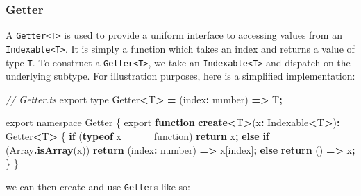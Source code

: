 \documentclass[
  openany]{book}
\newenvironment{Shaded}{\begin{snugshade}}{\end{snugshade}}
\newcommand{\BuiltInTok}[1]{#1}
\newcommand{\CommentTok}[1]{\textcolor[rgb]{0.56,0.35,0.01}{\textit{#1}}}
\newcommand{\ControlFlowTok}[1]{\textcolor[rgb]{0.13,0.29,0.53}{\textbf{#1}}}
\newcommand{\DataTypeTok}[1]{\textcolor[rgb]{0.13,0.29,0.53}{#1}}
\newcommand{\FunctionTok}[1]{\textcolor[rgb]{0.13,0.29,0.53}{\textbf{#1}}}
\newcommand{\ImportTok}[1]{#1}
\newcommand{\KeywordTok}[1]{\textcolor[rgb]{0.13,0.29,0.53}{\textbf{#1}}}
\newcommand{\NormalTok}[1]{#1}
\newcommand{\OperatorTok}[1]{\textcolor[rgb]{0.81,0.36,0.00}{\textbf{#1}}}
\newcommand{\VerbatimStringTok}[1]{\textcolor[rgb]{0.31,0.60,0.02}{#1}}
\theoremstyle{definition}
\theoremstyle{definition}
\theoremstyle{definition}
\theoremstyle{definition}
\theoremstyle{remark}
\begin{document}
\subsubsection{Getter}\label{getter}

A \texttt{Getter\textless{}T\textgreater{}} is used to provide a uniform interface to accessing values from an \texttt{Indexable\textless{}T\textgreater{}}. It is simply a function which takes an index and returns a value of type \texttt{T}. To construct a \texttt{Getter\textless{}T\textgreater{}}, we take an \texttt{Indexable\textless{}T\textgreater{}} and dispatch on the underlying subtype. For illustration purposes, here is a simplified implementation:

\begin{Shaded}
\begin{Highlighting}[]
\CommentTok{// Getter.ts}
\ImportTok{export type}\NormalTok{ Getter}\OperatorTok{\textless{}}\NormalTok{T}\OperatorTok{\textgreater{}} \OperatorTok{=}\NormalTok{ (index}\OperatorTok{:} \DataTypeTok{number}\NormalTok{) }\KeywordTok{=\textgreater{}}\NormalTok{ T}\OperatorTok{;}

\ImportTok{export} \ImportTok{namespace} \DataTypeTok{Getter}\NormalTok{ \{}
  \ImportTok{export} \KeywordTok{function} \FunctionTok{create}\OperatorTok{\textless{}}\NormalTok{T}\OperatorTok{\textgreater{}}\NormalTok{(x}\OperatorTok{:}\NormalTok{ Indexable}\OperatorTok{\textless{}}\NormalTok{T}\OperatorTok{\textgreater{}}\NormalTok{)}\OperatorTok{:}\NormalTok{ Getter}\OperatorTok{\textless{}}\NormalTok{T}\OperatorTok{\textgreater{}}\NormalTok{ \{}
    \ControlFlowTok{if}\NormalTok{ (}\KeywordTok{typeof}\NormalTok{ x }\OperatorTok{===} \VerbatimStringTok{\textasciigrave{}function\textasciigrave{}}\NormalTok{) }\ControlFlowTok{return}\NormalTok{ x}\OperatorTok{;}
    \ControlFlowTok{else} \ControlFlowTok{if}\NormalTok{ (}\BuiltInTok{Array}\OperatorTok{.}\FunctionTok{isArray}\NormalTok{(x)) }\ControlFlowTok{return}\NormalTok{ (index}\OperatorTok{:} \DataTypeTok{number}\NormalTok{) }\KeywordTok{=\textgreater{}}\NormalTok{ x[index]}\OperatorTok{;}
    \ControlFlowTok{else} \ControlFlowTok{return}\NormalTok{ () }\KeywordTok{=\textgreater{}}\NormalTok{ x}\OperatorTok{;}
\NormalTok{  \}}
\NormalTok{\}}
\end{Highlighting}
\end{Shaded}

we can then create and use \texttt{Getter}s like so:
\end{document}
